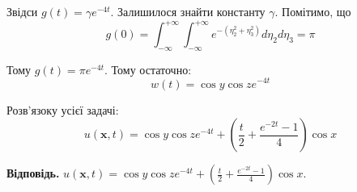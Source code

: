 \documentclass{hw_template}
\begin{document}
Звідси $g(t) = \gamma e^{-4t}$. Залишилося знайти константу $\gamma$. Помітимо, що
\begin{equation*}
    g(0) = \int_{-\infty}^{+\infty}\int_{-\infty}^{+\infty}e^{-\left(\eta_2^2+\eta_3^2\right)}d\eta_2 d\eta_3 = \pi
\end{equation*}

Тому $g(t) = \pi e^{-4t}$. Тому остаточно:
\begin{equation*}
    \boxed{w(t) = \cos y \cos z e^{-4t}}
\end{equation*}

Розв'язоку усієї задачі:
\begin{equation*}
    \boxed{u(\mathbf{x},t) = \cos y \cos z e^{-4t} + \left(\frac{t}{2}+\frac{e^{-2t}-1}{4}\right)\cos x}
\end{equation*}

\textbf{Відповідь.} $u(\mathbf{x},t) = \cos y \cos z e^{-4t} + \left(\frac{t}{2}+\frac{e^{-2t}-1}{4}\right)\cos x$.
\end{document}
